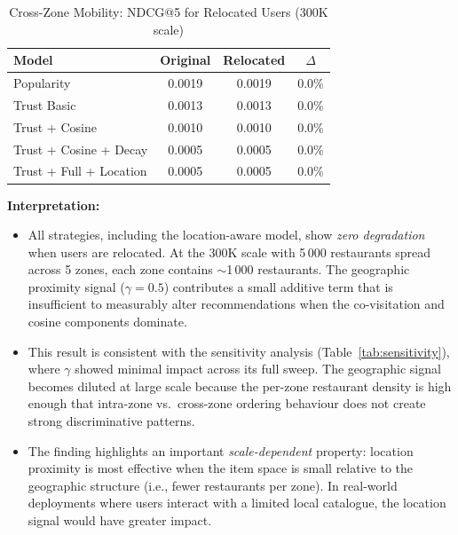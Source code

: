 \documentclass[conference]{IEEEtran}
\begin{document}
\begin{table}[h]
\centering
\caption{Cross-Zone Mobility: NDCG@5 for Relocated Users (300K scale)}
\label{tab:crosszone}
\begin{tabular}{lccc}
\toprule
\textbf{Model} & \textbf{Original} & \textbf{Relocated} & \textbf{$\Delta$} \\
\midrule
Popularity              & 0.0019 & 0.0019 & 0.0\%    \\
Trust Basic             & 0.0013 & 0.0013 & 0.0\%    \\
Trust + Cosine          & 0.0010 & 0.0010 & 0.0\%    \\
Trust + Cosine + Decay  & 0.0005 & 0.0005 & 0.0\%    \\
Trust + Full + Location & 0.0005 & 0.0005 & 0.0\%    \\
\bottomrule
\end{tabular}
\end{table}

\textbf{Interpretation:}

\begin{itemize}
  \item All strategies, including the location-aware model, show
        \emph{zero degradation} when users are relocated.  At the 300K
        scale with 5\,000 restaurants spread across 5 zones, each zone
        contains $\sim$1\,000 restaurants.  The geographic proximity
        signal ($\gamma = 0.5$) contributes a small additive term that
        is insufficient to measurably alter recommendations when the
        co-visitation and cosine components dominate.

  \item This result is consistent with the sensitivity analysis
        (Table~\ref{tab:sensitivity}), where $\gamma$ showed minimal
        impact across its full sweep.  The geographic signal becomes
        diluted at large scale because the per-zone restaurant density
        is high enough that intra-zone vs.\ cross-zone ordering
        behaviour does not create strong discriminative patterns.

  \item The finding highlights an important \emph{scale-dependent}
        property: location proximity is most effective when the item
        space is small relative to the geographic structure (i.e., fewer
        restaurants per zone).  In real-world deployments where users
        interact with a limited local catalogue, the location signal
        would have greater impact.
\end{itemize}
\end{document}
